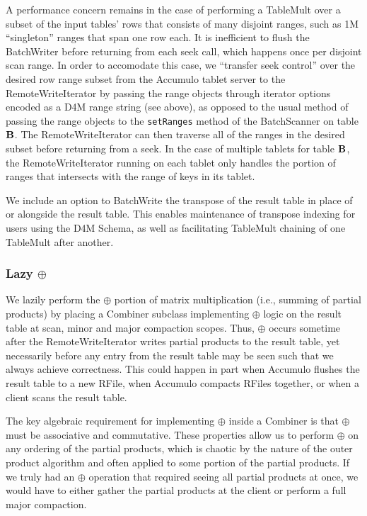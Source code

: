 A performance concern remains in the case of performing a TableMult over a subset of the input tables' rows 
that consists of many disjoint ranges, such as 1M ``singleton'' ranges that span one row each.
It is inefficient to flush the BatchWriter before returning from each seek call, which happens once per 
disjoint scan range.  In order to accomodate this case, we ``transfer seek control'' over the desired row range
subset from the Accumulo tablet server to the RemoteWriteIterator by passing the range objects through 
iterator options encoded as a D4M range string (see above), as opposed to the usual method of 
passing the range objects to the \texttt{setRanges} method of the BatchScanner on table $\mathbf{B}$.
The RemoteWriteIterator can then traverse all of the ranges in the desired subset before returning from a seek.
In the case of multiple tablets for table $\mathbf{B}$, the RemoteWriteIterator running on each tablet only handles 
the portion of ranges that intersects with the range of keys in its tablet.

We include an option to BatchWrite the transpose of the result table in place of or alongside
the result table. This enables maintenance of transpose indexing for users using the D4M Schema, as well as
facilitating TableMult chaining of one TableMult after another.

\subsubsection{Lazy $\oplus$}
We lazily perform the $\oplus$ portion of matrix multiplication (i.e., summing of partial products)
by placing a Combiner subclass implementing $\oplus$ logic on the result table at scan, minor and major compaction scopes.
Thus, $\oplus$ occurs sometime after the RemoteWriteIterator writes partial products to the result table,
yet necessarily before any entry from the result table may be seen such that we always achieve correctness.
This could happen in part when Accumulo flushes the result table to a new RFile, when Accumulo compacts RFiles 
together, or when a client scans the result table. 

The key algebraic requirement for implementing $\oplus$ inside a Combiner
is that $\oplus$ must be associative and commutative.
These properties allow us to perform $\oplus$ on any ordering of the partial products,
which is chaotic by the nature of the outer product algorithm and often applied to some portion of 
the partial products.%
If we truly had an $\oplus$ operation that required seeing all partial products at once,
we would have to either gather the partial products at the client or perform a full major compaction.


